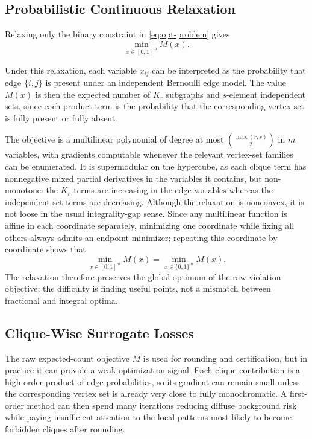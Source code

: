 \documentclass{article}
\begin{document}
\subsection{Probabilistic Continuous Relaxation}\label{sec:probabilistic-relaxation}

Relaxing only the binary constraint in \cref{eq:opt-problem} gives
\begin{equation}\label{eq:relaxed-problem}
    \min_{x \in [0,1]^m} M(x).
\end{equation}

Under this relaxation, each variable $x_{ij}$ can be interpreted as the probability that edge $\{i,j\}$ is present under an independent Bernoulli edge model. The value $M(x)$ is then the expected number of $K_r$ subgraphs and $s$-element independent sets, since each product term is the probability that the corresponding vertex set is fully present or fully absent.

The objective is a multilinear polynomial of degree at most $\binom{\max(r,s)}{2}$ in $m$ variables, with gradients computable whenever the relevant vertex-set families can be enumerated. It is supermodular on the hypercube, as each clique term has nonnegative mixed partial derivatives in the variables it contains, but non-monotone: the $K_r$ terms are increasing in the edge variables whereas the independent-set terms are decreasing. Although the relaxation is nonconvex, it is not loose in the usual integrality-gap sense. Since any multilinear function is affine in each coordinate separately, minimizing one coordinate while fixing all others always admits an endpoint minimizer; repeating this coordinate by coordinate shows that
\[
    \min_{x\in[0,1]^m} M(x)
    =
    \min_{x\in\{0,1\}^m} M(x).
\]
The relaxation therefore preserves the global optimum of the raw violation objective; the difficulty is finding useful points, not a mismatch between fractional and integral optima.


\subsection{Clique-Wise Surrogate Losses}\label{sec:surrogate}

The raw expected-count objective $M$ is used for rounding and certification, but in practice it can provide a weak optimization signal. Each clique contribution is a high-order product of edge probabilities, so its gradient can remain small unless the corresponding vertex set is already very close to fully monochromatic. A first-order method can then spend many iterations reducing diffuse background risk while paying insufficient attention to the local patterns most likely to become forbidden cliques after rounding.
\end{document}
